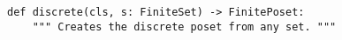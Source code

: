 \begin{verbatim}
def discrete(cls, s: FiniteSet) -> FinitePoset:
    """ Creates the discrete poset from any set. """
\end{verbatim}
